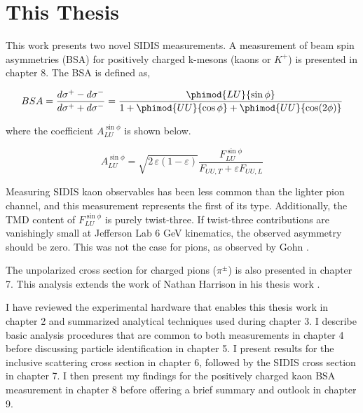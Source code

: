 \section{This Thesis}
This work presents two novel SIDIS measurements.  A measurement of beam spin asymmetries (BSA) for positively charged k-mesons (kaons or $K^+$) is presented in chapter 8.  The BSA is defined as, 

\begin{equation}
  BSA = \frac{d\sigma^+ - d\sigma^-}{d\sigma^+ + d\sigma^-} = \frac{\phimod{LU}{\sin\phi}}{1 + \phimod{UU}{\cos\phi} + \phimod{UU}{\cos(2\phi)}}
\end{equation}

where the coefficient $A_{LU}^{\sin\phi}$ is shown below.

\begin{equation}
  A_{LU}^{\sin\phi} = \sqrt{2\,\varepsilon (1-\varepsilon)} \frac{F_{LU}^{\sin\phi}}{F_{UU,T} + \varepsilon F_{UU,L}}
\end{equation}

Measuring SIDIS kaon observables has been less common than the lighter pion channel, and this measurement represents the first of its type.  Additionally, the TMD content of $F_{LU}^{\sin\phi}$ is purely twist-three.  If twist-three contributions are vanishingly small at Jefferson Lab 6 GeV kinematics, the observed asymmetry should be zero.  This was not the case for pions, as observed by Gohn \cite{theses-gohn:2012}.

The unpolarized cross section for charged pions ($\pi^{\pm}$) is also presented in chapter 7.  This analysis extends the work of Nathan Harrison in his thesis work \cite{theses-harrison:2015}.

I have reviewed the experimental hardware that enables this thesis work in chapter 2 and summarized analytical techniques used during chapter 3.  I describe basic analysis procedures that are common to both measurements in chapter 4 before discussing particle identification in chapter 5.  I present results for the inclusive scattering cross section in chapter 6, followed by the SIDIS cross section in chapter 7.  I then present my findings for the positively charged kaon BSA measurement in chapter 8 before offering a brief summary and outlook in chapter 9. 

